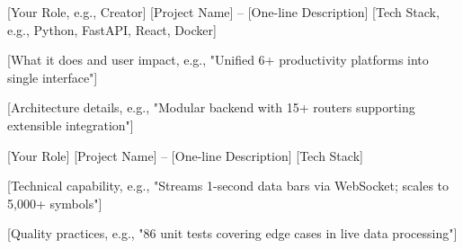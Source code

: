 

\begin{cventries}

  \cventry
    {[Your Role, e.g., Creator]} %
    {[Project Name] -- [One-line Description]} %
    {[Tech Stack, e.g., Python, FastAPI, React, Docker]} %
    {} %
    {
      \begin{cvitems}
        \item {[What it does and user impact, e.g., "Unified 6+ productivity platforms into single interface"]}
        \item {[Architecture details, e.g., "Modular backend with 15+ routers supporting extensible integration"]}
      \end{cvitems}
    }

  \cventry
    {[Your Role]} %
    {[Project Name] -- [One-line Description]} %
    {[Tech Stack]} %
    {} %
    {
      \begin{cvitems}
        \item {[Technical capability, e.g., "Streams 1-second data bars via WebSocket; scales to 5,000+ symbols"]}
        \item {[Quality practices, e.g., "86 unit tests covering edge cases in live data processing"]}
      \end{cvitems}
    }

\end{cventries}
